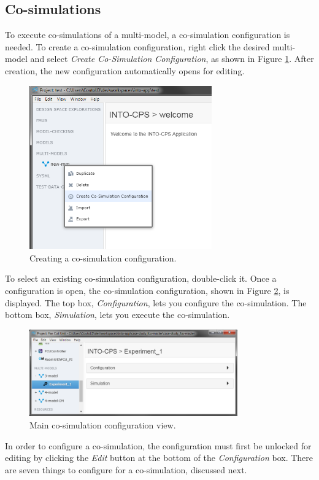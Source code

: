 \subsection{Co-simulations}
\label{sec:co-simulations}
To execute co-simulations of a multi-model, a co-simulation configuration is
needed. To create a co-simulation configuration, right click the desired
multi-model and select \textit{Create Co-Simulation Configuration}, as shown in Figure \ref{fig:new-cosim}.  After creation, the new configuration automatically opens for editing.
%
%
%
\begin{figure}[ht]
\centering
\includegraphics[width=0.7\textwidth]{./figures/app/new-cosim}
\caption{Creating a co-simulation configuration.}
\label{fig:new-cosim}
\end{figure}
%
%
%
To select an existing co-simulation configuration, double-click it. 
Once a configuration is open, the co-simulation configuration, shown in
Figure \ref{fig:cosim-view}, is displayed. The top box, \textit{Configuration},
lets you configure the co-simulation. The bottom box, \textit{Simulation},
lets you execute the co-simulation.
%
%
%
\begin{figure}[ht]
\centering
\includegraphics[width=0.8\textwidth]{./figures/app/cosim-view}
\caption{Main co-simulation configuration view.}
\label{fig:cosim-view}
\end{figure}
%
%
%
In order to configure a co-simulation, the configuration must first be unlocked for editing
by clicking the \textit{Edit} button at the bottom of the \textit{Configuration}
box. There are seven things to configure for a co-simulation, discussed next.

